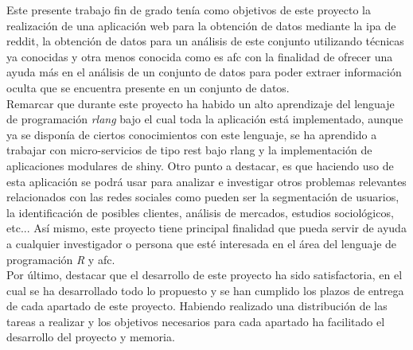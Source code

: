 \documentclass[../../main.tex]{subfiles}
\begin{document}
Este presente trabajo fin de grado tenía como objetivos de este proyecto la realización de una aplicación web para la obtención de datos mediante la \gls{ipa} de \Gls{reddit}, la obtención de datos para un análisis de este conjunto utilizando técnicas ya conocidas y otra menos conocida como es \gls{afc} con la finalidad de ofrecer una ayuda más en el análisis de un conjunto de datos para poder extraer información oculta que se encuentra presente en un conjunto de datos. \\

Remarcar que durante este proyecto ha habido un alto aprendizaje del lenguaje de programación \textit{\gls{rlang}} bajo el cual toda la aplicación está implementado, aunque ya se disponía de ciertos conocimientos con este lenguaje, se ha aprendido a trabajar con micro-servicios de tipo \gls{rest} bajo \gls{rlang} y la implementación de aplicaciones modulares de \Gls{shiny}. Otro punto a destacar, es que haciendo uso de esta aplicación se podrá usar para analizar e investigar otros problemas relevantes relacionados con las redes sociales como pueden ser la segmentación de usuarios, la identificación de posibles clientes, análisis de mercados, estudios sociológicos, etc... Así mismo, este proyecto tiene principal finalidad que pueda servir de ayuda a cualquier investigador o persona que esté interesada en el área del lenguaje de programación \textit{R} y \gls{afc}. \\

Por último, destacar que el desarrollo de este proyecto ha sido satisfactoria, en el cual se ha desarrollado todo lo propuesto y se han cumplido los plazos de entrega de cada apartado de este proyecto. Habiendo realizado una distribución de las tareas a  realizar y los objetivos necesarios para cada apartado ha facilitado el desarrollo del proyecto y memoria.  \\
\end{document}
